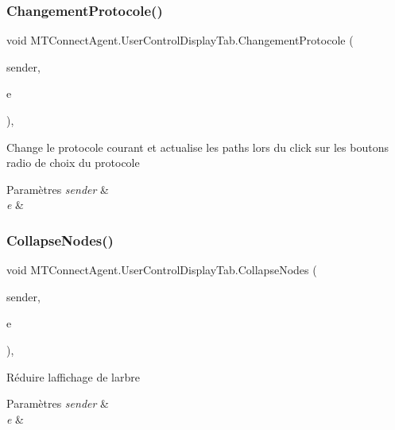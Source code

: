 \subsubsection{\texorpdfstring{Changement\+Protocole()}{ChangementProtocole()}}
{\footnotesize\ttfamily void M\+T\+Connect\+Agent.\+User\+Control\+Display\+Tab.\+Changement\+Protocole (\begin{DoxyParamCaption}\item[{object}]{sender,  }\item[{Event\+Args}]{e }\end{DoxyParamCaption})\hspace{0.3cm}{\ttfamily [inline]}, {\ttfamily [private]}}



Change le protocole courant et actualise les paths lors du click sur les boutons radio de choix du protocole 


\begin{DoxyParams}{Paramètres}
{\em sender} & \\
\hline
{\em e} & \\
\hline
\end{DoxyParams}
\mbox{\label{class_m_t_connect_agent_1_1_user_control_display_tab_a9e5f7105041510bae0e1da721a7bc4c3}} 
\subsubsection{\texorpdfstring{Collapse\+Nodes()}{CollapseNodes()}}
{\footnotesize\ttfamily void M\+T\+Connect\+Agent.\+User\+Control\+Display\+Tab.\+Collapse\+Nodes (\begin{DoxyParamCaption}\item[{object}]{sender,  }\item[{Mouse\+Event\+Args}]{e }\end{DoxyParamCaption})\hspace{0.3cm}{\ttfamily [inline]}, {\ttfamily [private]}}



Réduire l\textquotesingle{}affichage de l\textquotesingle{}arbre 


\begin{DoxyParams}{Paramètres}
{\em sender} & \\
\hline
{\em e} & \\
\hline
\end{DoxyParams}
\mbox{\label{class_m_t_connect_agent_1_1_user_control_display_tab_ac473c5026d9d7af94210c53170be841b}} 

